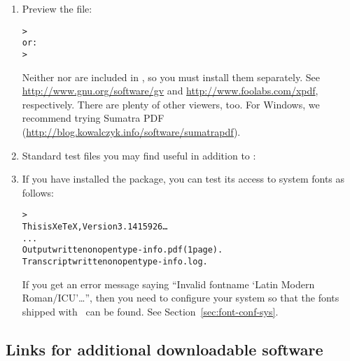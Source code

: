\documentclass{article}
\begin{document}
\begin{enumerate}
\item Preview the  file:
\begin{alltt}
> 
\textrm{or:}
> 
\end{alltt}
Neither  nor  are included in \TL{}, so you
must install them separately.  See \url{http://www.gnu.org/software/gv}
and \url{http://www.foolabs.com/xpdf}, respectively.  There are plenty
of other  viewers, too.  For Windows, we recommend trying
Sumatra PDF (\url{http://blog.kowalczyk.info/software/sumatrapdf}).

\item Standard test files you may find useful in addition to
:


\item If you have installed the  package, you can test
its access to system fonts as follows:
\begin{alltt}
> 
This is XeTeX, Version 3.1415926\dots
...
Output written on opentype-info.pdf (1 page).
Transcript written on opentype-info.log.
\end{alltt}

If you get an error message saying ``Invalid fontname `Latin Modern
Roman/ICU'\dots'', then you need to configure your system so that the
fonts shipped with \TL\ can be found.  See
Section~\ref{sec:font-conf-sys}.

\end{enumerate}

\subsection{Links for additional downloadable software}
\end{document}
